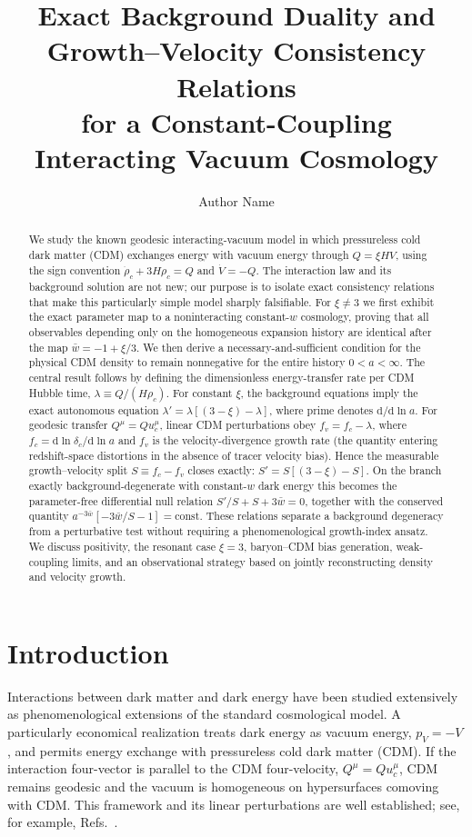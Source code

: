 \documentclass[11pt]{article}
\title{Exact Background Duality and Growth--Velocity Consistency Relations\\
for a Constant-Coupling Interacting Vacuum Cosmology}
\author{Author Name}
\date{}
\theoremstyle{remark}
\newcommand{\dd}{\mathrm d}
\begin{document}
\maketitle

\begin{abstract}
We study the known geodesic interacting-vacuum model in which pressureless cold dark matter (CDM) exchanges energy with vacuum energy through
$Q=\xi H V$, using the sign convention
$\dot\rho_c+3H\rho_c=Q$ and $\dot V=-Q$.
The interaction law and its background solution are not new; our purpose is to isolate exact consistency relations that make this particularly simple model sharply falsifiable.
For $\xi\neq3$ we first exhibit the exact parameter map to a noninteracting constant-$w$ cosmology, proving that all observables depending only on the homogeneous expansion history are identical after the map
$\bar w=-1+\xi/3$.
We then derive a necessary-and-sufficient condition for the physical CDM density to remain nonnegative for the entire history $0<a<\infty$.
The central result follows by defining the dimensionless energy-transfer rate per CDM Hubble time,
$\lambda\equiv Q/(H\rho_c)$.
For constant $\xi$, the background equations imply the exact autonomous equation
$\lambda'=\lambda[(3-\xi)-\lambda]$, where prime denotes $\dd/\dd\ln a$.
For geodesic transfer $Q^\mu=Q u_c^\mu$, linear CDM perturbations obey
$f_v=f_c-\lambda$, where $f_c=\dd\ln\delta_c/\dd\ln a$ and $f_v$ is the velocity-divergence growth rate (the quantity entering redshift-space distortions in the absence of tracer velocity bias).
Hence the measurable growth--velocity split $S\equiv f_c-f_v$ closes exactly:
$S'=S[(3-\xi)-S]$.
On the branch exactly background-degenerate with constant-$w$ dark energy this becomes the parameter-free differential null relation
$S'/S+S+3\bar w=0$, together with the conserved quantity
$a^{-3\bar w}[-3\bar w/S-1]=\mathrm{const}$.
These relations separate a background degeneracy from a perturbative test without requiring a phenomenological growth-index ansatz.
We discuss positivity, the resonant case $\xi=3$, baryon--CDM bias generation, weak-coupling limits, and an observational strategy based on jointly reconstructing density and velocity growth.
\end{abstract}

\section{Introduction}

Interactions between dark matter and dark energy have been studied extensively as phenomenological extensions of the standard cosmological model.  A particularly economical realization treats dark energy as vacuum energy, $p_V=-V$, and permits energy exchange with pressureless cold dark matter (CDM).  If the interaction four-vector is parallel to the CDM four-velocity, $Q^\mu=Q u_c^\mu$, CDM remains geodesic and the vacuum is homogeneous on hypersurfaces comoving with CDM.  This framework and its linear perturbations are well established; see, for example, Refs.~\cite{Martinelli2019,BorgesWands2020,Kaeonikhom2023}.
\end{document}
